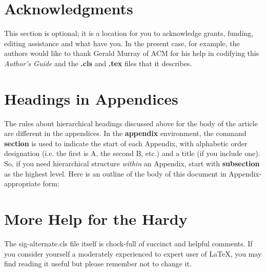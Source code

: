 \documentclass{sig-alternate}
\begin{document}
\section{Acknowledgments}
This section is optional; it is a location for you
to acknowledge grants, funding, editing assistance and
what have you.  In the present case, for example, the
authors would like to thank Gerald Murray of ACM for
his help in codifying this \textit{Author's Guide}
and the \textbf{.cls} and \textbf{.tex} files that it describes.

%

%
%
\appendix
\section{Headings in Appendices}
The rules about hierarchical headings discussed above for
the body of the article are different in the appendices.
In the \textbf{appendix} environment, the command
\textbf{section} is used to
indicate the start of each Appendix, with alphabetic order
designation (i.e. the first is A, the second B, etc.) and
a title (if you include one).  So, if you need
hierarchical structure
\textit{within} an Appendix, start with \textbf{subsection} as the
highest level. Here is an outline of the body of this
document in Appendix-appropriate form:
\section{More Help for the Hardy}
The sig-alternate.cls file itself is chock-full of succinct
and helpful comments.  If you consider yourself a moderately
experienced to expert user of \LaTeX, you may find reading
it useful but please remember not to change it.
\end{document}
